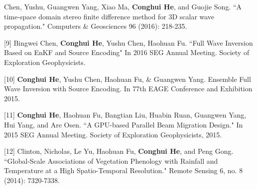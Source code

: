 \documentclass[11pt, a4paper]{awesome-cv}
\begin{document}
\begin{cvparagraph}
[8] \hspace{0.5mm} Chen, Yushu, Guangwen Yang, Xiao Ma, \textbf{Conghui He}, and Guojie Song. ``A time-space domain stereo finite difference method for 3D scalar wave propagation." Computers \& Geosciences 96 (2016): 218-235.

[9] \hspace{0.5mm} Bingwei Chen, \textbf{Conghui He}, Yushu Chen, Haohuan Fu. ``Full Wave Inversion Based on EnKF and Source Encoding" In 2016 SEG Annual Meeting. Society of Exploration Geophysicists.

[10] \hspace{0.5mm} \textbf{Conghui He}, Yushu Chen, Haohuan Fu, \& Guangwen Yang. Ensemble Full Wave Inversion with Source Encoding. In 77th EAGE Conference and Exhibition 2015.

[11] \hspace{0.5mm} \textbf{Conghui He}, Haohuan Fu, Bangtian Liu, Huabin Ruan, Guangwen Yang, Hui Yang, and Are Osen. ``A GPU-based Parallel Beam Migration Design." In 2015 SEG Annual Meeting. Society of Exploration Geophysicists, 2015.

[12] \hspace{0.5mm} Clinton, Nicholas, Le Yu, Haohuan Fu, \textbf{Conghui He}, and Peng Gong. ``Global-Scale Associations of Vegetation Phenology with Rainfall and Temperature at a High Spatio-Temporal Resolution." Remote Sensing 6, no. 8 (2014): 7320-7338.
\end{cvparagraph}


\end{document}
